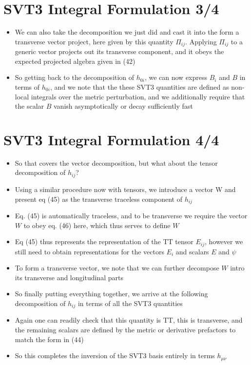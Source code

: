 \documentclass[10pt,letterpaper]{article}
\numberwithin{equation}{section}
\begin{document}
\section{SVT3 Integral Formulation 3/4}
\begin{itemize}
	\item We can also take the decomposition we just did and cast it into the form a transverse vector project, here given by this quantity $\Pi_{ij}$. Applying $\Pi_{ij}$ to a generic vector projects out its transverse component, and it obeys the expected projected algebra given in (42)
	\item So getting back to the decomposition of $h_{0i}$, we can now express $B_i$ and $B$ in terms of $h_{0i}$, and we note that the these SVT3 quantities are defined as non-local integrals over the metric perturbation, and we additionally require that the scalar $B$ vanish asymptotically or decay sufficiently fast
\end{itemize}


\section{SVT3 Integral Formulation 4/4}
\begin{itemize}
	\item So that covers the vector decomposition, but what about the tensor decomposition of $h_{ij}$? 
	\item Using a similar procedure now with tensors, we introduce a vector W and present eq (45) as the transverse traceless component of $h_{ij}$
	\item Eq. (45) is automatically traceless, and to be transverse we require the vector $W$ to obey eq. (46) here, which thus serves to define $W$
	\item Eq (45) thus represents the representation of the TT tensor $E_{ij}$, however we still need to obtain representations for the vectors $E_i$ and scalars $E$ and $\psi$
	\item To form a transverse vector, we note that we can further decompose $W$ intro its transverse and longitudinal parts
	\item So finally putting everything together, we arrive at the following decomposition of $h_{ij}$ in terms of all the SVT3 quantities
	\item Again one can readily check that this quantity is TT, this is transverse, and the remaining scalars are defined by the metric or derivative prefactors to match the form in (44)
	\item So this completes the inversion of the SVT3 basis entirely in terms $h_{\mu\nu}$
\end{itemize}
\end{document}
